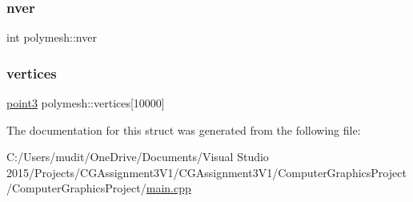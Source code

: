 \subsubsection{\texorpdfstring{nver}{nver}}
{\footnotesize\ttfamily int polymesh\+::nver}

\hypertarget{structpolymesh_aca19ad588279843271d078618e536bd5}{}\label{structpolymesh_aca19ad588279843271d078618e536bd5} 
\subsubsection{\texorpdfstring{vertices}{vertices}}
{\footnotesize\ttfamily \hyperlink{structpoint3}{point3} polymesh\+::vertices\mbox{[}10000\mbox{]}}



The documentation for this struct was generated from the following file\+:\begin{DoxyCompactItemize}
\item 
C\+:/\+Users/mudit/\+One\+Drive/\+Documents/\+Visual Studio 2015/\+Projects/\+C\+G\+Assignment3\+V1/\+C\+G\+Assignment3\+V1/\+Computer\+Graphics\+Project/\+Computer\+Graphics\+Project/\hyperlink{main_8cpp}{main.\+cpp}\end{DoxyCompactItemize}

